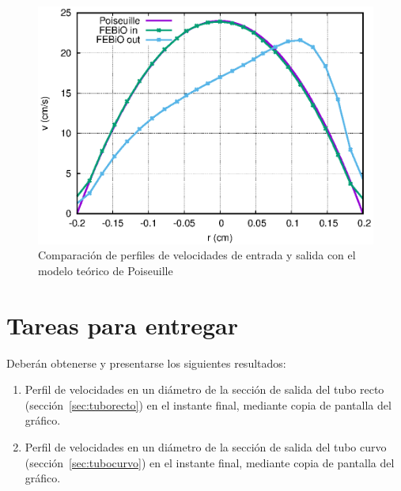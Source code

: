 \begin{figure}[!ht]
\centering
\includegraphics[width=0.6\linewidth]{figuras_4/qtor-vr_comp.eps}
\caption{Comparación de perfiles de velocidades de entrada y salida con el modelo teórico de Poiseuille}
\label{fig:qtor-vr_comp}
\end{figure}

\clearpage
\section{Tareas para entregar}
\label{sec:tareas}

Deberán obtenerse y presentarse los siguientes resultados:%
\begin{enumerate}
	\item
	Perfil de velocidades en un diámetro de la sección de salida del tubo recto (sección~\ref{sec:tuborecto}) en el instante final, mediante copia de pantalla del gráfico.
	\item
	Perfil de velocidades en un diámetro de la sección de salida del tubo curvo (sección~\ref{sec:tubocurvo}) en el instante final, mediante copia de pantalla del gráfico.
\end{enumerate}